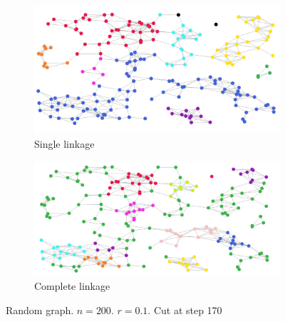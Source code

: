 \documentclass[12pt,a4paper]{article}
\begin{document}
\begin{figure}
  \centering
  \begin{subfigure}[h]{0.8\textwidth}
    \includegraphics[width=\linewidth]{img/slink-200-170-01.png}
    \caption{Single linkage}
  \end{subfigure}
  \begin{subfigure}[h]{0.8\textwidth}
    \includegraphics[width=\linewidth]{img/clink-200-170-01.png}
    \caption{Complete linkage}
  \end{subfigure}
  \caption{Random graph. $n = 200$. $r = 0.1$. Cut at step 170}
  \label{fig:170-0.1}
\end{figure}
\end{document}
